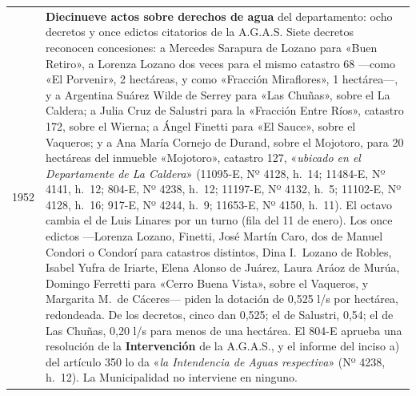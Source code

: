 \begin{longtable}{@{}p{2.7cm}p{10.3cm}@{}}
1952 & \textbf{Diecinueve actos sobre derechos de agua} del departamento: ocho decretos y once edictos citatorios de la A.G.A.S. Siete decretos reconocen concesiones: a Mercedes Sarapura de Lozano para «Buen Retiro», a Lorenza Lozano dos veces para el mismo catastro 68 ---como «El Porvenir», 2 hectáreas, y como «Fracción Miraflores», 1 hectárea---, y a Argentina Suárez Wilde de Serrey para «Las Chuñas», sobre el La Caldera; a Julia Cruz de Salustri para la «Fracción Entre Ríos», catastro 172, sobre el Wierna; a Ángel Finetti para «El Sauce», sobre el Vaqueros; y a Ana María Cornejo de Durand, sobre el Mojotoro, para 20 hectáreas del inmueble «Mojotoro», catastro 127, «\textit{ubicado en el Departamente de La Caldera}» (11095-E, Nº 4128, h.\ 14; 11484-E, Nº 4141, h.\ 12; 804-E, Nº 4238, h.\ 12; 11197-E, Nº 4132, h.\ 5; 11102-E, Nº 4128, h.\ 16; 917-E, Nº 4244, h.\ 9; 11653-E, Nº 4150, h.\ 11). El octavo cambia el de Luis Linares por un turno (fila del 11 de enero). Los once edictos ---Lorenza Lozano, Finetti, José Martín Caro, dos de Manuel Condori o Condorí para catastros distintos, Dina I.\ Lozano de Robles, Isabel Yufra de Iriarte, Elena Alonso de Juárez, Laura Aráoz de Murúa, Domingo Ferretti para «Cerro Buena Vista», sobre el Vaqueros, y Margarita M.\ de Cáceres--- piden la dotación de 0,525 l/s por hectárea, redondeada. De los decretos, cinco dan 0,525; el de Salustri, 0,54; el de Las Chuñas, 0,20 l/s para menos de una hectárea. El 804-E aprueba una resolución de la \textbf{Intervención} de la A.G.A.S., y el informe del inciso a) del artículo 350 lo da «\textit{la Intendencia de Aguas respectiva}» (Nº 4238, h.\ 12). La Municipalidad no interviene en ninguno. \\

\end{longtable}
